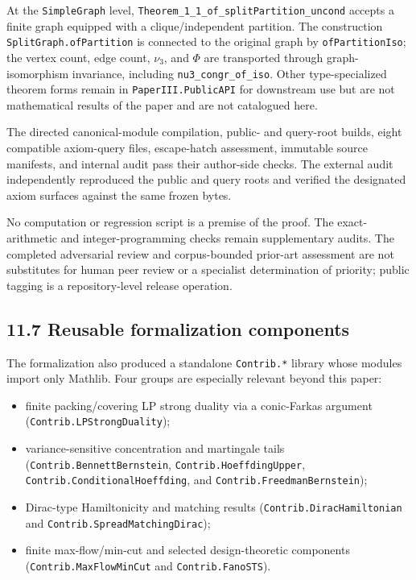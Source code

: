 \documentclass[english,11pt,a4paper]{article}
\providecommand{\tightlist}{\setlength{\itemsep}{0pt}\setlength{\parskip}{0pt}}
\begin{document}
At the \nolinkurl{SimpleGraph} level,
\nolinkurl{Theorem_1_1_of_splitPartition_uncond} accepts a finite
graph equipped with a clique/independent partition. The construction
\nolinkurl{SplitGraph.ofPartition} is connected to the original graph by
\nolinkurl{ofPartitionIso}; the vertex count, edge count, \(\nu_3\), and
\(\Phi\) are transported through graph-isomorphism invariance, including
\nolinkurl{nu3_congr_of_iso}. Other type-specialized theorem forms
remain in \nolinkurl{PaperIII.PublicAPI} for downstream use but are not
mathematical results of the paper and are not catalogued here.

The directed canonical-module compilation, public- and query-root
builds, eight compatible axiom-query files, escape-hatch assessment,
immutable source manifests, and internal audit pass their author-side
checks. The external audit independently reproduced the public and query
roots and verified the designated axiom surfaces against the same frozen
bytes.

No computation or regression script is a premise of the proof. The
exact-arithmetic and integer-programming checks remain supplementary
audits. The completed adversarial review and corpus-bounded prior-art
assessment are not substitutes for human peer review or a specialist
determination of priority; public tagging is a repository-level release
operation.

\subsection{11.7 Reusable formalization
components}\label{reusable-formalization-components}

The formalization also produced a standalone \nolinkurl{Contrib.*} library
whose modules import only Mathlib. Four groups are especially relevant
beyond this paper:

\begin{itemize}
\tightlist
\item
  finite packing/covering LP strong duality via a conic-Farkas argument
  (\nolinkurl{Contrib.LPStrongDuality});
\item
  variance-sensitive concentration and martingale tails
  (\nolinkurl{Contrib.BennettBernstein}, \nolinkurl{Contrib.HoeffdingUpper},
  \nolinkurl{Contrib.ConditionalHoeffding}, and
  \nolinkurl{Contrib.FreedmanBernstein});
\item
  Dirac-type Hamiltonicity and matching results
  (\nolinkurl{Contrib.DiracHamiltonian} and
  \nolinkurl{Contrib.SpreadMatchingDirac});
\item
  finite max-flow/min-cut and selected design-theoretic components
  (\nolinkurl{Contrib.MaxFlowMinCut} and \nolinkurl{Contrib.FanoSTS}).
\end{itemize}
\end{document}
